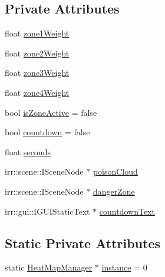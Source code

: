 \subsection*{Private Attributes}
\begin{DoxyCompactItemize}
\item 
float \hyperlink{class_heat_map_manager_a428c9124cfc0e4667e5d935fce050e3f}{zone1\-Weight}
\item 
float \hyperlink{class_heat_map_manager_a82299e638dd3f8e4c6e7cbf4706c0d0b}{zone2\-Weight}
\item 
float \hyperlink{class_heat_map_manager_aefbd0636746ab18ae5d305e4b3268ace}{zone3\-Weight}
\item 
float \hyperlink{class_heat_map_manager_a627d9bb3ce50a7473fdf84d9a048da9d}{zone4\-Weight}
\item 
bool \hyperlink{class_heat_map_manager_af53f13b64f955d297dd1d6a489ac2053}{is\-Zone\-Active} = false
\item 
bool \hyperlink{class_heat_map_manager_a659cbc23eff012306ca58bb794d9a9c1}{countdown} = false
\item 
float \hyperlink{class_heat_map_manager_a506cd0b3cef22e132ae74b5b8d264ed4}{seconds}
\item 
irr\-::scene\-::\-I\-Scene\-Node $\ast$ \hyperlink{class_heat_map_manager_a506da7726ec2f7d989ad407edd7b365d}{poison\-Cloud}
\item 
irr\-::scene\-::\-I\-Scene\-Node $\ast$ \hyperlink{class_heat_map_manager_ad5ca224ccce646f0c6fdfce6d48d1c13}{danger\-Zone}
\item 
irr\-::gui\-::\-I\-G\-U\-I\-Static\-Text $\ast$ \hyperlink{class_heat_map_manager_a6cbba801f3d09c86fa63a05180cd181e}{countdown\-Text}
\end{DoxyCompactItemize}
\subsection*{Static Private Attributes}
\begin{DoxyCompactItemize}
\item 
static \hyperlink{class_heat_map_manager}{Heat\-Map\-Manager} $\ast$ \hyperlink{class_heat_map_manager_a11d267fe86b6494e623674c2a8a8801a}{instance} = 0
\end{DoxyCompactItemize}


